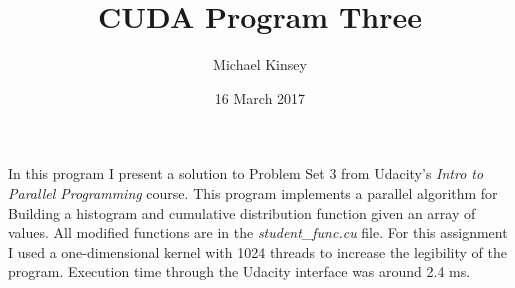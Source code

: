 \documentclass{article}
\begin{document}
\title{CUDA Program Three}
\author{Michael Kinsey}
\date{16 March 2017}
\maketitle

In this program I present a solution to Problem Set 3 from Udacity's \textit{Intro
to Parallel Programming} course. This program implements a parallel algorithm for
Building a histogram and cumulative distribution function given an array of 
values. All modified functions are in the \textit{student\_func.cu} file. 
For this assignment I used a one-dimensional kernel with 1024 threads to increase
the legibility of the program.
Execution time through the Udacity interface was around 2.4 ms.\\
\end{document}
